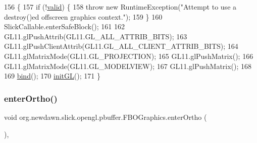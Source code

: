 \begin{DoxyCode}
156                             \{
157         \textcolor{keywordflow}{if} (!\mbox{\hyperlink{classorg_1_1newdawn_1_1slick_1_1opengl_1_1pbuffer_1_1_f_b_o_graphics_a75f5500bcba77517cbb586456bab19a6}{valid}}) \{
158             \textcolor{keywordflow}{throw} \textcolor{keyword}{new} RuntimeException(\textcolor{stringliteral}{"Attempt to use a destroy()ed offscreen graphics context."});
159         \}
160         SlickCallable.enterSafeBlock();
161         
162         GL11.glPushAttrib(GL11.GL\_ALL\_ATTRIB\_BITS);
163         GL11.glPushClientAttrib(GL11.GL\_ALL\_CLIENT\_ATTRIB\_BITS);
164         GL11.glMatrixMode(GL11.GL\_PROJECTION);
165         GL11.glPushMatrix();
166         GL11.glMatrixMode(GL11.GL\_MODELVIEW);
167         GL11.glPushMatrix();
168         
169         \mbox{\hyperlink{classorg_1_1newdawn_1_1slick_1_1opengl_1_1pbuffer_1_1_f_b_o_graphics_afb781a7fc3cb297e55a94440653a1bb3}{bind}}();
170         \mbox{\hyperlink{classorg_1_1newdawn_1_1slick_1_1opengl_1_1pbuffer_1_1_f_b_o_graphics_a90fe529215a03036496bfa22dc27546d}{initGL}}();
171     \}
\end{DoxyCode}
\mbox{\label{classorg_1_1newdawn_1_1slick_1_1opengl_1_1pbuffer_1_1_f_b_o_graphics_a68aa1165ae60456ee23cefee575e38d2}} 
\subsubsection{\texorpdfstring{enter\+Ortho()}{enterOrtho()}}
{\footnotesize\ttfamily void org.\+newdawn.\+slick.\+opengl.\+pbuffer.\+F\+B\+O\+Graphics.\+enter\+Ortho (\begin{DoxyParamCaption}{ }\end{DoxyParamCaption})\hspace{0.3cm}{\ttfamily [inline]}, {\ttfamily [protected]}}

